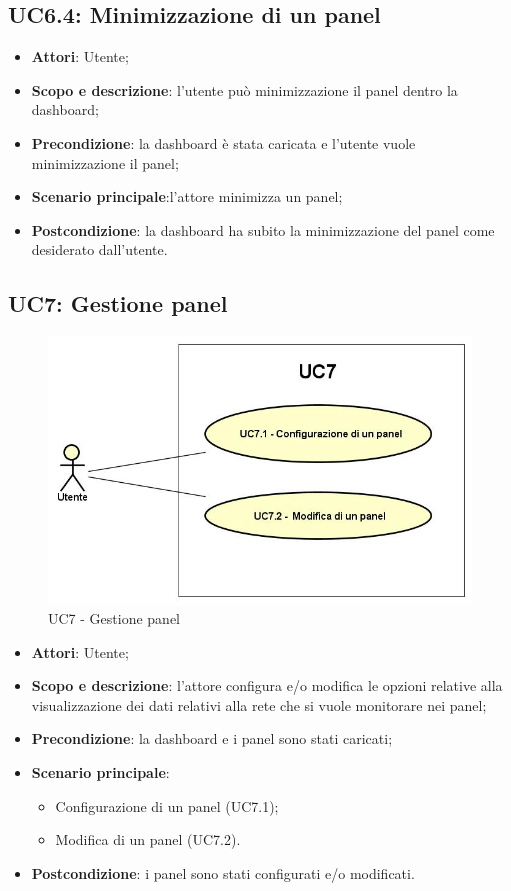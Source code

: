 \subsection{UC6.4: Minimizzazione di un panel}
\hypertarget{UC6.4}{}
\begin{itemize}
	\item \textbf{Attori}: Utente;
	\item \textbf{Scopo e descrizione}: l'utente può minimizzazione il panel dentro la dashboard;
	\item \textbf{Precondizione}: la dashboard è stata caricata e l'utente vuole minimizzazione il panel;
	\item \textbf{Scenario principale}:l'attore minimizza un panel;
	\item \textbf{Postcondizione}: la dashboard ha subito la minimizzazione del panel come desiderato dall'utente.
\end{itemize}
\subsection{UC7: Gestione panel}
\hypertarget{UC7}{}
\begin{figure} [H]
	\centering
	\includegraphics[scale=0.45]{Img/UC7}
	\caption{UC7 - Gestione panel}\label{}
\end{figure}
\begin{itemize}
	\item \textbf{Attori}: Utente;
	\item \textbf{Scopo e descrizione}: l'attore configura e/o modifica le opzioni relative alla visualizzazione dei dati relativi alla rete che si vuole monitorare nei panel;
	\item \textbf{Precondizione}: la dashboard e i panel sono stati caricati;
	\item \textbf{Scenario principale}:
	\begin{itemize}
		\item Configurazione di un panel (UC7.1);
		\item Modifica di un panel (UC7.2).
	\end{itemize}
	\item \textbf{Postcondizione}: i panel sono stati configurati e/o modificati.
\end{itemize}
